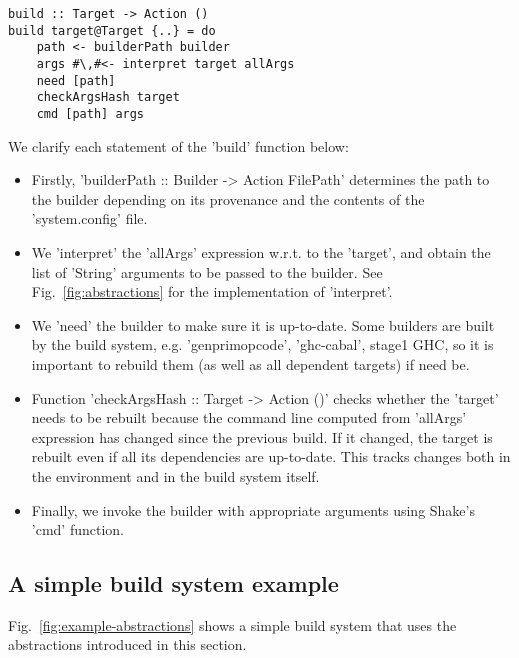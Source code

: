 \begin{lstlisting}
build :: Target -> Action ()
build target@Target {..} = do
    path <- builderPath builder
    args #\,#<- interpret target allArgs
    need [path]
    checkArgsHash target
    cmd [path] args
\end{lstlisting}

\noindent We clarify each statement of the \lst'build' function below:
\begin{itemize}
  \item Firstly, \lst'builderPath :: Builder -> Action FilePath' determines the
  path to the builder depending on its provenance and the contents of the
  \lst'system.config' file.
  \item We \lst'interpret' the \lst'allArgs' expression w.r.t. to the
  \lst'target', and obtain the list of \lst'String' arguments to be passed to
  the builder. See Fig.~\ref{fig:abstractions} for the implementation of
  \lst'interpret'.
  \item We \lst'need' the builder to make sure it is up-to-date. Some builders
  are built by the build system, e.g. \lst'genprimopcode',
  \lst'ghc-cabal', stage1 GHC, so it is important to rebuild them (as well as
  all dependent targets) if need be.
  \item Function \lst'checkArgsHash :: Target -> Action ()' checks whether the
  \lst'target' needs to be rebuilt because the command line computed from
  \lst'allArgs' expression has changed since the previous build. If it changed,
  the target is rebuilt even if all its dependencies are up-to-date. This tracks
  changes both in the environment and in the build system itself.
  \item Finally, we invoke the builder with appropriate arguments using Shake's
  \lst'cmd' function.
\end{itemize}

\subsection{A simple build system example}

Fig.~\ref{fig:example-abstractions} shows a simple build system that uses the
abstractions introduced in this section.

